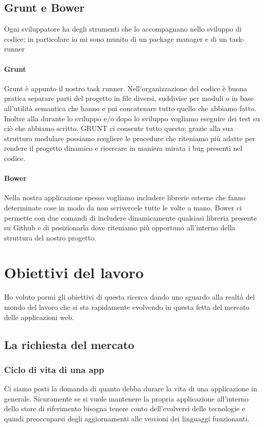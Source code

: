 \subsection{Grunt e Bower}
Ogni sviluppatore ha degli strumenti che lo accompagnano nello sviluppo di codice; in particolare io mi sono munito di un package manager e di un task-runner
\paragraph{Grunt}
Grunt è appunto il nostro task runner. Nell'organizzazione del codice è buona pratica separare parti del progetto in file diversi, suddivise per moduli o in base all'utilità semantica che hanno e poi concatenare tutto quello che abbiamo fatto. Inoltre alla durante lo sviluppo e/o dopo lo sviluppo vogliamo eseguire dei test su ciò che abbiamo scritto. GRUNT ci consente tutto questo; grazie alla sua struttura modulare possiamo scegliere le procedure che riteniamo più adatte per rendere il progetto dinamico e ricercare in maniera mirata i bug presenti nel codice.
\paragraph{Bower}
Nella nostra applicazione spesso vogliamo includere librerie esterne che fanno determinate cose in modo da non scrivercele tutte le volte a mano. Bower ci permette con due comandi di includere dinamicamente qualsiasi libreria presente su Github e di posizionarla dove riteniamo più opportuno all'interno della struttura del nostro progetto.  
\section{Obiettivi del lavoro}
Ho voluto pormi gli obiettivi di questa ricerca dando uno sguardo alla realtà del mondo del lavoro che si sta rapidamente evolvendo in questa fetta del mercato delle applicazioni web.
\subsection{La richiesta del mercato}
\subsubsection{Ciclo di vita di una app}
Ci siamo posti la domanda di quanto debba durare la vita di una applicazione in generale. Sicuramente se si vuole mantenere la propria applicazione all'interno dello store di riferimento bisogna tenere conto dell'evolversi delle tecnologie e quindi preoccuparsi degli aggiornamenti alle versioni dei linguaggi funzionanti. 
